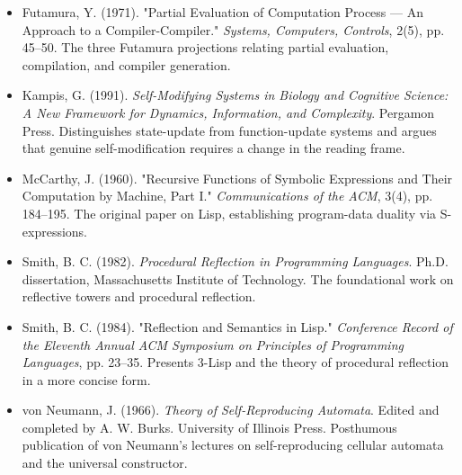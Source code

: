 \begin{itemize}
\item Futamura, Y. (1971). "Partial Evaluation of Computation Process --- An Approach to a Compiler-Compiler." \textit{Systems, Computers, Controls}, 2(5), pp. 45--50. The three Futamura projections relating partial evaluation, compilation, and compiler generation.
\end{itemize}

\begin{itemize}
\item Kampis, G. (1991). \textit{Self-Modifying Systems in Biology and Cognitive Science: A New Framework for Dynamics, Information, and Complexity}. Pergamon Press. Distinguishes state-update from function-update systems and argues that genuine self-modification requires a change in the reading frame.
\end{itemize}

\begin{itemize}
\item McCarthy, J. (1960). "Recursive Functions of Symbolic Expressions and Their Computation by Machine, Part I." \textit{Communications of the ACM}, 3(4), pp. 184--195. The original paper on Lisp, establishing program-data duality via S-expressions.
\end{itemize}

\begin{itemize}
\item Smith, B. C. (1982). \textit{Procedural Reflection in Programming Languages}. Ph.D. dissertation, Massachusetts Institute of Technology. The foundational work on reflective towers and procedural reflection.
\end{itemize}

\begin{itemize}
\item Smith, B. C. (1984). "Reflection and Semantics in Lisp." \textit{Conference Record of the Eleventh Annual ACM Symposium on Principles of Programming Languages}, pp. 23--35. Presents 3-Lisp and the theory of procedural reflection in a more concise form.
\end{itemize}

\begin{itemize}
\item von Neumann, J. (1966). \textit{Theory of Self-Reproducing Automata}. Edited and completed by A. W. Burks. University of Illinois Press. Posthumous publication of von Neumann's lectures on self-reproducing cellular automata and the universal constructor.
\end{itemize}

